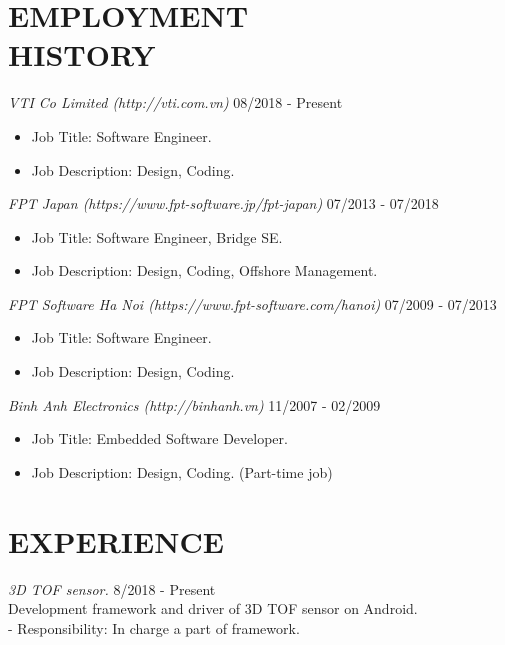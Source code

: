 \documentclass[margin]{res}
\begin{document}
\begin{resume}
 
\section{EMPLOYMENT \\ HISTORY}
		{\sl VTI Co Limited (http://vti.com.vn)}  \hfill 08/2018 - Present
                 \begin{itemize}  \itemsep -2pt  %
                 \item Job Title: Software Engineer.
		 \item Job Description:  Design, Coding. 
                 \end{itemize}

		{\sl FPT Japan (https://www.fpt-software.jp/fpt-japan)}  \hfill 07/2013 - 07/2018
                 \begin{itemize}  \itemsep -2pt  %
                 \item Job Title: Software Engineer, Bridge SE.
		 \item Job Description:  Design, Coding, Offshore Management. 
                 \end{itemize}

		 {\sl FPT Software Ha Noi (https://www.fpt-software.com/hanoi)}  \hfill 07/2009 - 07/2013
                 \begin{itemize}  \itemsep -2pt  %
                 \item Job Title: Software Engineer.
		 \item Job Description: Design, Coding.
                 \end{itemize}

		 {\sl Binh Anh Electronics (http://binhanh.vn)}   \hfill 11/2007 - 02/2009
                 \begin{itemize}  \itemsep -2pt  %
		 \item Job Title: Embedded Software Developer. 
		 \item Job Description: Design, Coding. (Part-time job)
                 \end{itemize}
        
\section{EXPERIENCE}
                {\sl 3D TOF sensor.} \hfill            8/2018 - Present \\
		 Development framework and driver of 3D TOF sensor on Android.\\
		 - Responsibility: In charge a part of framework.



\end{resume}
\end{document}
